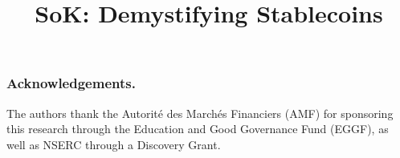 \documentclass[sigconf]{acmart}
\begin{document}
\title{SoK: Demystifying Stablecoins}
%

\begin{abstract}

\end{abstract}


%
%
%

%

\keywords{}


\maketitle



\subsubsection*{Acknowledgements.}
The authors thank the Autorit\'e des March\'es Financiers (AMF) for sponsoring this research through the Education and Good Governance Fund (EGGF), as well as NSERC through a Discovery Grant. 




\end{document}
